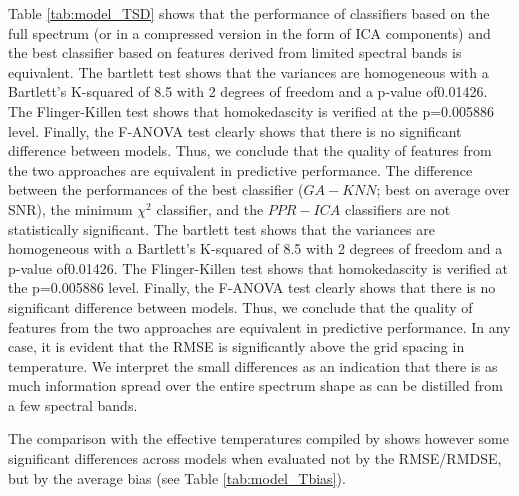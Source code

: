 Table \ref{tab:model_TSD} shows that the performance of classifiers
based on the full spectrum (or in a compressed version in the form of
ICA components) and the best classifier based on features derived from
limited spectral bands is equivalent. The bartlett test shows that the
variances are homogeneous with a Bartlett\textquoteright s K-squared
of 8.5 with 2 degrees of freedom and a p-value of0.01426. The
Flinger-Killen test shows that homokedascity is verified at the
p=0.005886 level. Finally, the F-ANOVA test clearly shows that there
is no significant difference between models. Thus, we conclude that
the quality of features from the two approaches are equivalent in
predictive performance.  The difference between the performances of
the best classifier ($GA-KNN$; best on average over SNR), the minimum
$\chi^2$ classifier, and the $PPR-ICA$ classifiers are not
statistically significant. The bartlett test shows that the variances
are homogeneous with a Bartlett\textquoteright s K-squared of 8.5 with
2 degrees of freedom and a p-value of0.01426. The Flinger-Killen test
shows that homokedascity is verified at the p=0.005886 level. Finally,
the F-ANOVA test clearly shows that there is no significant difference
between models. Thus, we conclude that the quality of features from
the two approaches are equivalent in predictive performance.  In any
case, it is evident that the RMSE is significantly above the grid
spacing in temperature. We interpret the small differences as an
indication that there is as much information spread over the entire
spectrum shape as can be distilled from a few spectral bands.

The comparison with the effective temperatures compiled by
\cite{cesetti} shows however some significant differences across
models when evaluated not by the RMSE/RMDSE, but by the average bias
(see Table \ref{tab:model_Tbias}). 

